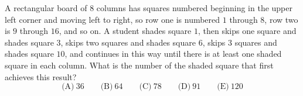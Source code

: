 A rectangular board of $8$ columns has squares numbered beginning in the upper left corner and moving left to right, so row one is numbered $1$ through $8$, row two is $9$ through $16$, and so on. A student shades square $1$, then skips one square and shades square $3$, skips two squares and shades square $6$, skips $3$ squares and shades square $10$, and continues in this way until there is at least one shaded square in each column. What is the number of the shaded square that first achieves this result?
\[
\text{(A)}\ 36\qquad\text{(B)}\ 64\qquad\text{(C)}\ 78\qquad\text{(D)}\ 91\qquad\text{(E)}\ 120
\]
